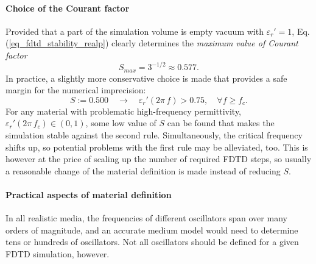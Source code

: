 \paragraph{Choice of the Courant factor}%
Provided that a part of the simulation volume is empty vacuum with $\varepsilon_r'=1$, Eq. (\ref{eq_fdtd_stability_realp}) clearly determines the \textit{maximum value of Courant factor} 
$$S_{max} = 3^{-1/2}\approx0.577.$$
In practice, a slightly more conservative choice is made that provides a safe margin for the numerical imprecision: 
\begin{equation} S:= 0.500 \quad \rightarrow \quad \varepsilon_r'(2\pi\,f)> 0.75, \quad \forall f \geq f_c. \label{eq_courant_choice}\end{equation}
For any material with problematic high-frequency permittivity, $\varepsilon_r'(2\pi\,f_c) \in (0, 1)$, some low value of $S$ can be found that makes the simulation stable against the second rule. Simultaneously, the critical frequency shifts up, so potential problems with the first rule may be alleviated, too. This is however at the price of scaling up the number of required FDTD steps, so usually a reasonable change of the material definition is made instead of reducing $S$.



\paragraph{Practical aspects of material definition} %
In all realistic media, the frequencies of different oscillators span over many orders of magnitude, and an accurate medium model would need to determine tens or hundreds of oscillators. Not all oscillators should be defined for a given FDTD simulation, however. 

